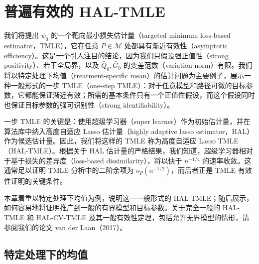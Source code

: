 \chapter{普遍有效的 HAL-TMLE}
\label{ch:generally-efficient-hal-tmle}

我们将提出 $\psi_0$ 的一个靶向最小损失估计量（targeted minimum loss-based estimator，TMLE），它在任意 $P\in\mathcal M$ 处都具有渐近有效性（asymptotic efficiency）。这是一个引人注目的结论，因为我们只假设强正值性（strong positivity）、若干全局界，以及 $\bar Q_0,\bar G_0$ 的变差范数（variation norm）有限。我们将以特定处理下均值（treatment-specific mean）的估计问题为主要例子，展示一种一般形式的一步 TMLE（one-step TMLE）：对于任意模型和路径可微的目标参数，它都能保证渐近有效；所需的基本条件只有一个正值性假设，而这个假设同时也保证目标参数的强可识别性（strong identifiability）。

\begin{sourcebox}
一步 TMLE 的关键是：使用超级学习器（super learner）作为初始估计量，并在算法库中纳入高度自适应 Lasso 估计量（highly adaptive lasso estimator，HAL）作为候选估计量。因此，我们将这样的 TMLE 称为高度自适应 Lasso TMLE（HAL-TMLE）。根据关于 HAL 估计量的严格结果，我们知道，超级学习器相对于基于损失的差异度（loss-based dissimilarity），将以快于 $n^{-1/4}$ 的速率收敛。这通常足以证明 TMLE 分析中的二阶余项为 $o_P(n^{-1/2})$，而后者正是 TMLE 有效性证明的关键条件。
\end{sourcebox}

本章着重以特定处理下均值为例，说明这一一般形式的 HAL-TMLE；随后展示，如何容易地将证明推广到一般的有界模型和目标参数。关于完全一般的 HAL-TMLE 和 HAL-CV-TMLE 及其一般有效性定理，包括允许无界模型的情形，请参阅我们的论文 van der Laan（2017）。

\section{特定处理下的均值}
\label{sec:ch07-treatment-specific-mean}

